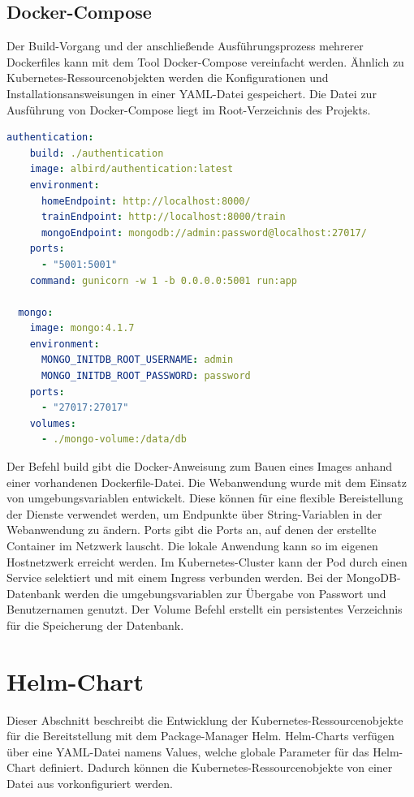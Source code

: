 \subsection{Docker-Compose}

Der Build-Vorgang und der anschließende Ausführungsprozess mehrerer Dockerfiles kann mit dem Tool Docker-Compose vereinfacht werden.
Ähnlich zu Kubernetes-Ressourcenobjekten werden die Konfigurationen und Installationsansweisungen in einer YAML-Datei gespeichert.
Die Datei zur Ausführung von Docker-Compose liegt im Root-Verzeichnis des Projekts.

\begin{lstlisting}[caption={Ausschnit aus dem docker-compose.yaml},captionpos=b ,label={lst:docker-compose.yaml},language=yaml,float,floatplacement=H]
  authentication:
    build: ./authentication
    image: albird/authentication:latest
    environment:
      homeEndpoint: http://localhost:8000/
      trainEndpoint: http://localhost:8000/train 
      mongoEndpoint: mongodb://admin:password@localhost:27017/
    ports:
      - "5001:5001"
    command: gunicorn -w 1 -b 0.0.0.0:5001 run:app

  mongo:
    image: mongo:4.1.7
    environment:
      MONGO_INITDB_ROOT_USERNAME: admin
      MONGO_INITDB_ROOT_PASSWORD: password
    ports:
      - "27017:27017"
    volumes:
      - ./mongo-volume:/data/db
\end{lstlisting}

Der Befehl build gibt die Docker-Anweisung zum Bauen eines Images anhand einer vorhandenen Dockerfile-Datei.
Die Webanwendung wurde mit dem Einsatz von umgebungsvariablen entwickelt.
Diese können für eine flexible Bereistellung der Dienste verwendet werden, um Endpunkte über String-Variablen in der Webanwendung zu ändern.
Ports gibt die Ports an, auf denen der erstellte Container im Netzwerk lauscht.
Die lokale Anwendung kann so im eigenen Hostnetzwerk erreicht werden.
Im Kubernetes-Cluster kann der Pod durch einen Service selektiert und mit einem Ingress verbunden werden.
Bei der MongoDB-Datenbank werden die umgebungsvariablen zur Übergabe von Passwort und Benutzernamen genutzt.
Der Volume Befehl erstellt ein persistentes Verzeichnis für die Speicherung der Datenbank.


\section{Helm-Chart}\label{helmcharts}
Dieser Abschnitt beschreibt die Entwicklung der Kubernetes-Ressourcenobjekte für die Bereitstellung mit dem Package-Manager Helm.
Helm-Charts verfügen über eine YAML-Datei namens Values, welche globale Parameter für das Helm-Chart definiert.
Dadurch können die Kubernetes-Ressourcenobjekte von einer Datei aus vorkonfiguriert werden.



